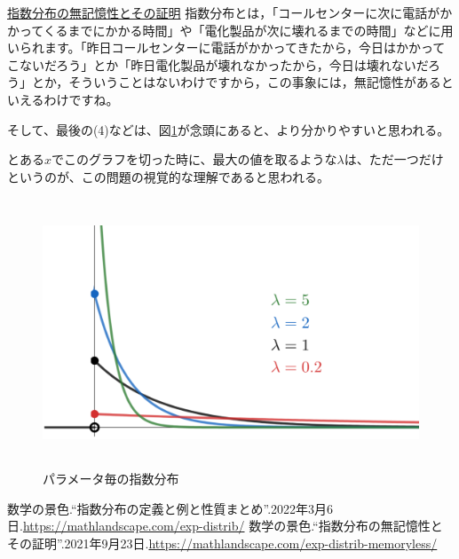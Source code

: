 \documentclass[a4paper, 10pt, dvipdfmx]{jlreq}
\begin{document}
\begin{itembox}[l]{\href{https://mathlandscape.com/exp-distrib-memoryless/}{指数分布の無記憶性とその証明}}
  指数分布とは，「コールセンターに次に電話がかかってくるまでにかかる時間」や「電化製品が次に壊れるまでの時間」などに用いられます。「昨日コールセンターに電話がかかってきたから，今日はかかってこないだろう」とか「昨日電化製品が壊れなかったから，今日は壊れないだろう」とか，そういうことはないわけですから，この事象には，無記憶性があるといえるわけですね。
\end{itembox}

そして、最後の(4)などは、図\ref{img:param}が念頭にあると、より分かりやすいと思われる。

とある$x$でこのグラフを切った時に、最大の値を取るような$\lambda$は、ただ一つだけというのが、この問題の視覚的な理解であると思われる。

\newpage

\begin{figure}[htbp]
  \begin{center}
    \includegraphics[height=80mm]{exp-distrib-many-1024x583.png}
    \caption{パラメータ毎の指数分布 \cite{site:1}}
    \label{img:param}
  \end{center}
\end{figure}


\begin{thebibliography}{9}
  数学の景色.``指数分布の定義と例と性質まとめ''.2022年3月6日.\url{https://mathlandscape.com/exp-distrib/}
  数学の景色.``指数分布の無記憶性とその証明''.2021年9月23日.\url{https://mathlandscape.com/exp-distrib-memoryless/}
\end{thebibliography}
\end{document}
